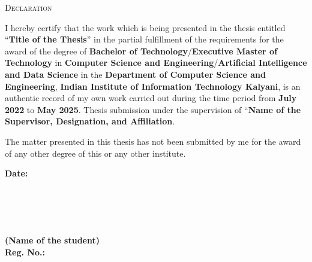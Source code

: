  \cleardoublepage
 \thispagestyle{empty}
 \begin{center}
  {\LARGE \textsc{Declaration}}
 \end{center}
 \vspace{0.3cm}


I hereby certify that the work which is being presented in the
thesis entitled ``\textbf{Title of the Thesis}'' in the partial
fulfillment of the requirements for the award of the degree of
\textbf{Bachelor of Technology}/\textbf{Executive Master of
Technology} in \textbf{Computer Science and
Engineering}/\textbf{Artificial Intelligence and Data Science} in
the \textbf{Department of Computer Science and Engineering},
\textbf{Indian Institute of Information Technology Kalyani}, is an
authentic record of my own work carried out during the time period
from \textbf{July 2022} to \textbf{May 2025}. Thesis submission
under the supervision of ``\textbf{Name of the Supervisor,
Designation, and Affiliation}.

\noindent The matter presented in this thesis has not been submitted
by me for the award of any other degree of this or any other
institute.


\vspace{1in}

\begin{minipage}[l]{0.2\textwidth}%
\textbf{Date:}~
\\
\\
\\
\\
\\
\end{minipage}
\hfill
\begin{minipage}[r]{0.7\textwidth}%
\begin{flushright}
    \textbf{(Name of the student)}\\
    \textbf{Reg. No.:}~\\
    \\
    \\
\end{flushright}
\end{minipage}

